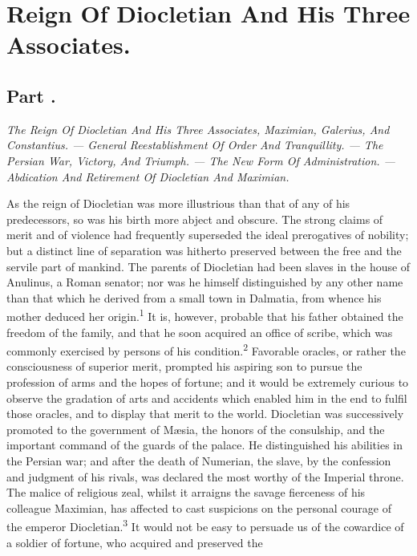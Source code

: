 \chapter{Reign Of Diocletian And His Three Associates.}
\section{Part \thesection.}

\textit{The Reign Of Diocletian And His Three Associates, Maximian,
Galerius, And Constantius. — General Reestablishment Of Order And
Tranquillity. — The Persian War, Victory, And Triumph. — The New Form
Of Administration. — Abdication And Retirement Of Diocletian And
Maximian.}
\vspace{\onelineskip}

As the reign of Diocletian was more illustrious than that of any
of his predecessors, so was his birth more abject and obscure.
The strong claims of merit and of violence had frequently
superseded the ideal prerogatives of nobility; but a distinct
line of separation was hitherto preserved between the free and
the servile part of mankind. The parents of Diocletian had been
slaves in the house of Anulinus, a Roman senator; nor was he
himself distinguished by any other name than that which he
derived from a small town in Dalmatia, from whence his mother
deduced her origin.\textsuperscript{1} It is, however, probable that his father
obtained the freedom of the family, and that he soon acquired an
office of scribe, which was commonly exercised by persons of his
condition.\textsuperscript{2} Favorable oracles, or rather the consciousness of
superior merit, prompted his aspiring son to pursue the
profession of arms and the hopes of fortune; and it would be
extremely curious to observe the gradation of arts and accidents
which enabled him in the end to fulfil those oracles, and to
display that merit to the world. Diocletian was successively
promoted to the government of Mæsia, the honors of the
consulship, and the important command of the guards of the
palace. He distinguished his abilities in the Persian war; and
after the death of Numerian, the slave, by the confession and
judgment of his rivals, was declared the most worthy of the
Imperial throne. The malice of religious zeal, whilst it arraigns
the savage fierceness of his colleague Maximian, has affected to
cast suspicions on the personal courage of the emperor
Diocletian.\textsuperscript{3} It would not be easy to persuade us of the
cowardice of a soldier of fortune, who acquired and preserved the
